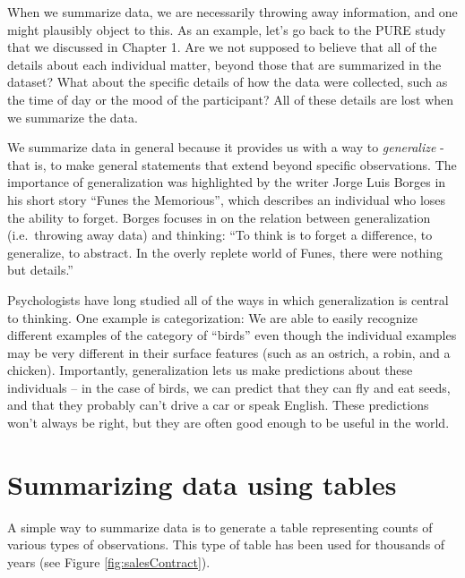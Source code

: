\documentclass[12pt,]{book}
\theoremstyle{definition}
\theoremstyle{definition}
\theoremstyle{definition}
\theoremstyle{remark}
\begin{document}
When we summarize data, we are necessarily throwing away information, and one might plausibly object to this. As an example, let's go back to the PURE study that we discussed in Chapter 1. Are we not supposed to believe that all of the details about each individual matter, beyond those that are summarized in the dataset? What about the specific details of how the data were collected, such as the time of day or the mood of the participant? All of these details are lost when we summarize the data.

We summarize data in general because it provides us with a way to \emph{generalize} - that is, to make general statements that extend beyond specific observations. The importance of generalization was highlighted by the writer Jorge Luis Borges in his short story ``Funes the Memorious'', which describes an individual who loses the ability to forget. Borges focuses in on the relation between generalization (i.e.~throwing away data) and thinking: ``To think is to forget a difference, to generalize, to abstract. In the overly replete world of Funes, there were nothing but details.''

Psychologists have long studied all of the ways in which generalization is central to thinking. One example is categorization: We are able to easily recognize different examples of the category of ``birds'' even though the individual examples may be very different in their surface features (such as an ostrich, a robin, and a chicken). Importantly, generalization lets us make predictions about these individuals -- in the case of birds, we can predict that they can fly and eat seeds, and that they probably can't drive a car or speak English. These predictions won't always be right, but they are often good enough to be useful in the world.

\hypertarget{summarizing-data-using-tables}{%
\section{Summarizing data using tables}\label{summarizing-data-using-tables}}

A simple way to summarize data is to generate a table representing counts of various types of observations. This type of table has been used for thousands of years (see Figure \ref{fig:salesContract}).
\end{document}
